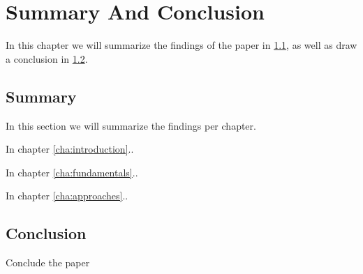 \chapter{Summary And Conclusion}
In this chapter we will summarize the findings of the paper in \ref{sec:summary}, as well as draw a conclusion in \ref{sec:conclusion}.
\label{cha:summary}
\section{Summary}
\label{sec:summary}
In this section we will summarize the findings per chapter.

\quad In chapter \ref{cha:introduction}..

\quad In chapter \ref{cha:fundamentals}..

\quad In chapter \ref{cha:approaches}..


\section{Conclusion}
\label{sec:conclusion}
Conclude the paper

